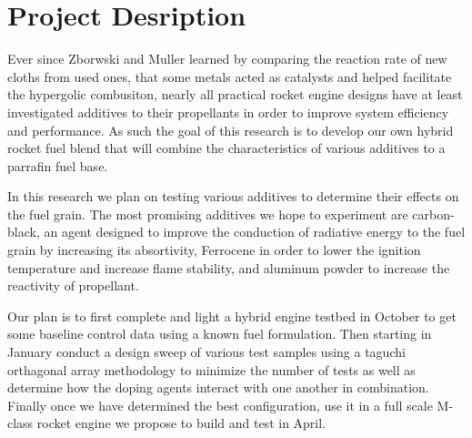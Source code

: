 \documentclass[letterpaper, 10 pt]{ieeeconf}
\begin{document}
\section{Project Desription}
\label{sec:Project Description}
Ever since Zborwski and Muller learned by comparing the reaction rate of new cloths from used ones, that some metals acted as catalysts and helped facilitate the hypergolic combusiton\cite{ignition}, nearly all practical rocket engine designs have at least investigated additives to their propellants in order to improve system efficiency and performance. As such the goal of this research is to develop our own hybrid rocket fuel blend that will combine the characteristics of various additives to a parrafin fuel base.  

In this research we plan on testing various additives to determine their effects on the fuel grain. The most promising additives we hope to experiment are carbon-black, an agent designed to improve the conduction of radiative energy to the fuel grain by increasing its absortivity\cite{T59IREC2018}, Ferrocene in order to lower the ignition temperature and increase flame stability, and aluminum powder to increase the reactivity of propellant. 

Our plan is to first complete and light a hybrid engine testbed in October to get some baseline control data using a known fuel formulation. Then starting in January conduct a design sweep of various test samples using a taguchi orthagonal array methodology to minimize the number of tests as well as determine how the doping agents interact with one another in combination. Finally once we have determined the best configuration, use it in a full scale M-class rocket engine we propose to build and test in April.



\end{document}
